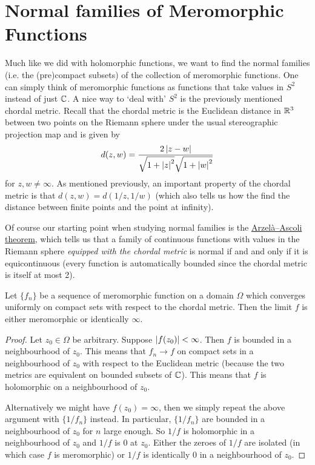 \section{Normal families of Meromorphic Functions}
Much like we did with holomorphic functions, we want to find the normal families (i.e. the (pre)compact subsets) of the collection of meromorphic functions. One can simply think of meromorphic functions as functions that take values in $S^2$ instead of just $\mathbb{C}$. A nice way to `deal with' $S^2$ is the previously mentioned chordal metric. Recall that the chordal metric is the Euclidean distance in $\mathbb{R}^3$ between two points on the Riemann sphere under the usual stereographic projection map and is given by 
$$d(z, w) = \frac{2\left|z - w\right|}{\sqrt{1 + \left|z\right|^2} \sqrt{1 + \left|w\right|^2}}$$
for $z, w \neq \infty$. As mentioned previously, an important property of the chordal metric is that $d(z, w) = d(1/z, 1/w)$ (which also tells us how the find the distance between finite points and the point at infinity). 

Of course our starting point when studying normal families is the \hyperref[thm:arzela-ascoli]{Arzelà–Ascoli theorem}, which tells us that a family of continuous functions with values in the Riemann sphere \textit{equipped with the chordal metric} is normal if and and only if it is equicontinuous (every function is automatically bounded since the chordal metric is itself at most 2).

\begin{lemma}\label{lem:conv-merom-or-inf}
    Let $\{f_n\}$ be a sequence of meromorphic function on a domain $\Omega$ which converges uniformly on compact sets with respect to the chordal metric. Then the limit $f$ is either meromorphic or identically $\infty$.
\end{lemma}
\begin{proof}
    Let $z_0 \in \Omega$ be arbitrary. Suppose $\left|f(z_0)\right| < \infty$. Then $f$ is bounded in a neighbourhood of $z_0$. This means that $f_n \to f$ on compact sets in a neighbourhood of $z_0$ with respect to the Euclidean metric (because the two metrics are equivalent on bounded subsets of $\mathbb{C}$). This means that $f$ is holomorphic on a neighbourhood of $z_0$.

    Alternatively we might have $f(z_0) = \infty$, then we simply repeat the above argument with $\{1/f_n\}$ instead. In particular, $\{1/f_n\}$ are bounded in a neighbourhood of $z_0$ for $n$ large enough. So $1/f$ is holomorphic in a neighbourhood of $z_0$ and $1/f$ is 0 at $z_0$. Either the zeroes of $1/f$ are isolated (in which case $f$ is meromorphic) or $1/f$ is identically 0 in a neighbourhood of $z_0$. 
\end{proof}

